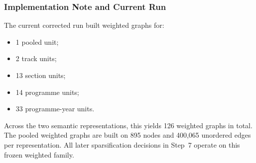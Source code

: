 \subsubsection{Implementation Note and Current Run}
\label{sec:step6_implementation_note}

The current corrected run built weighted graphs for:
\begin{itemize}
    \item 1 pooled unit;
    \item 2 track units;
    \item 13 section units;
    \item 14 programme units;
    \item 33 programme-year units.
\end{itemize}

Across the two semantic representations, this yields 126 weighted graphs in total. The pooled weighted graphs are built on 895 nodes and 400,065 unordered edges per representation. All later sparsification decisions in Step~7 operate on this frozen weighted family.
